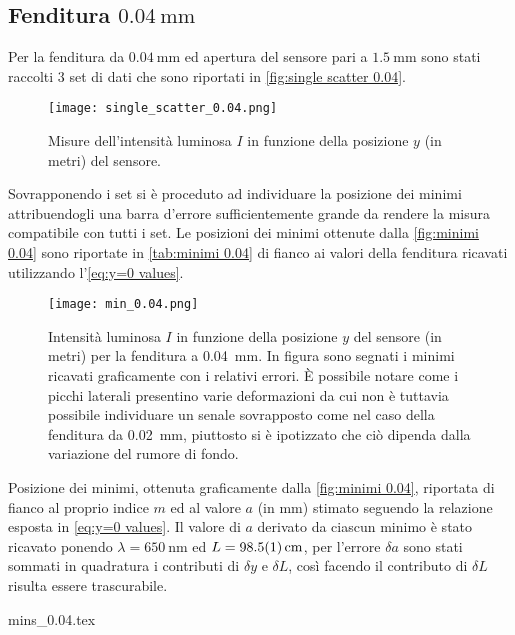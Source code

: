 \documentclass[../main.tex]{subfiles}
\begin{document}
\subsection{Fenditura $\qty{0.04}{\mm}$}

Per la fenditura da $\qty{0.04}{\mm}$ ed apertura del sensore pari a $\qty{1.5}{\mm}$ sono stati raccolti $3$ set di dati che sono riportati in \autoref{fig:single scatter 0.04}.

\begin{figure}[ht!]
    \centering
    \texttt{[image: single\_scatter\_0.04.png]}
    \caption{Misure dell'intensità luminosa $I$ in funzione della posizione $y$ (in metri) del sensore.} %
    \label{fig:single scatter 0.04}
\end{figure}

\newpage

Sovrapponendo i set si è proceduto ad individuare la posizione dei minimi attribuendogli una barra d'errore sufficientemente grande da rendere la misura compatibile con tutti i set. Le posizioni dei minimi ottenute dalla \autoref{fig:minimi 0.04} sono riportate in \autoref{tab:minimi 0.04} di fianco ai valori della fenditura ricavati utilizzando l'\autoref{eq:y=0 values}.

\begin{figure}[ht!]
    \centering
    \texttt{[image: min\_0.04.png]}
    \caption{Intensità luminosa $I$ in funzione della posizione $y$ del sensore (in metri) per la fenditura a \qty{0.04}{\mm}. In figura sono segnati i minimi ricavati graficamente con i relativi errori. È possibile notare come i picchi laterali presentino varie deformazioni da cui non è tuttavia possibile individuare un senale sovrapposto come nel caso della fenditura da \qty{0.02}{\mm}, piuttosto si è ipotizzato che ciò dipenda dalla variazione del rumore di fondo. %
    } %
    \label{fig:minimi 0.04}
\end{figure}

\begin{table}[ht!]
    \centering
    \caption{Posizione dei minimi, ottenuta graficamente dalla \autoref{fig:minimi 0.04}, riportata di fianco al proprio indice $m$ ed al valore $a$ (in $\si{\mm}$) stimato seguendo la relazione esposta in \autoref{eq:y=0 values}. Il valore di $a$ derivato da ciascun minimo è stato ricavato ponendo $\lambda = \qty{650}{\nm}$ ed $L = \qty{98.5+-0.1}{\cm}$, per l'errore $\delta a$ sono stati sommati in quadratura i contributi di $\delta y$ e $\delta L$, così facendo il contributo di $\delta L$ risulta essere trascurabile.}
    {mins_0.04.tex}
    \label{tab:minimi 0.04}
\end{table}
\end{document}
